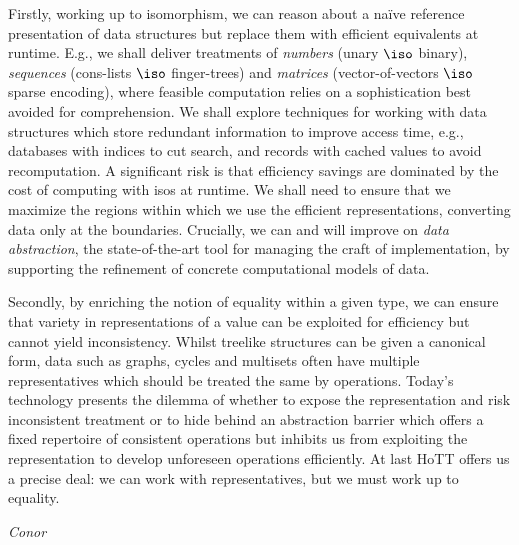 \documentclass[twocolumn,a4paper,11pt]{article}
\newcommand{\txa}[1]{\textcolor{red}{\textbf{Thorsten:~}#1}}
\begin{document}
Firstly, working up to isomorphism, we can reason about a na\"ive
reference presentation of data structures but replace them with
efficient equivalents at runtime. E.g., we shall deliver treatments of
\emph{numbers} (unary $\iso$ binary), \emph{sequences} (cons-lists
$\iso$ finger-trees) and \emph{matrices} (vector-of-vectors $\iso$
sparse encoding), where feasible computation relies on a
sophistication best avoided for comprehension. We shall explore
techniques for working with data structures which store redundant
information to improve access time, e.g., databases with indices to
cut search, and records with cached values to avoid recomputation. A
significant risk is that efficiency savings are dominated by the cost
of computing with isos at runtime. We shall need to ensure that we
maximize the regions within which we use the efficient
representations, converting data only at the boundaries.  Crucially,
we can and will improve on \emph{data abstraction}, the
state-of-the-art tool for managing the craft of implementation, by
supporting the refinement of concrete computational models of data.

Secondly, by enriching the notion of equality within a given type, we
can ensure that variety in representations of a value can be exploited
for efficiency but cannot yield inconsistency. Whilst treelike
structures can be given a canonical form, data such as graphs, cycles
and multisets often have multiple representatives which should be
treated the same by operations. Today's technology presents the
dilemma of whether to expose the representation and risk inconsistent
treatment or to hide behind an abstraction barrier which offers a
fixed repertoire of consistent operations but inhibits us from
exploiting the representation to develop unforeseen operations
efficiently. At last HoTT offers us a precise deal: we can work with
representatives, but we must work up to equality.


\emph{Conor}




\end{document}
